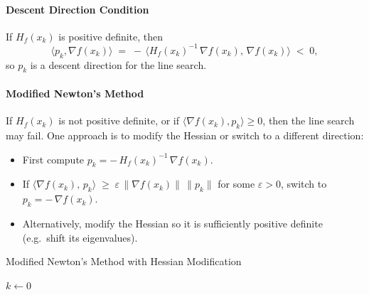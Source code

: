 \paragraph{Descent Direction Condition}
If \(H_f(x_k)\) is positive definite, then
\[
  \langle p_k, \nabla f(x_k)\rangle
  \;=\;
  -\,\langle H_f(x_k)^{-1}\,\nabla f(x_k),\,\nabla f(x_k)\rangle
  \;<\; 0,
\]
so \(p_k\) is a descent direction for the line search.

\paragraph{Modified Newton's Method}
If \(H_f(x_k)\) is not positive definite, or if \(\langle \nabla f(x_k), p_k\rangle \geq 0\), then the line search may fail. One approach is to modify the Hessian or switch to a different direction:

\begin{itemize}
  \item First compute \(p_k = -\,H_f(x_k)^{-1}\,\nabla f(x_k)\).
  \item If \(\langle \nabla f(x_k),\,p_k\rangle \;\ge\; \varepsilon \,\|\nabla f(x_k)\|\,\|p_k\|\) for some \(\varepsilon > 0\), switch to \(p_k = -\,\nabla f(x_k)\).
  \item Alternatively, modify the Hessian so it is sufficiently positive definite (e.g.\ shift its eigenvalues).
\end{itemize}

\begin{algorithm}[H]
  \caption{Modified Newton's Method with Hessian Modification}
  \label{alg:newton-modified}
  \(k \gets 0\)\;
  \;
\end{algorithm}

